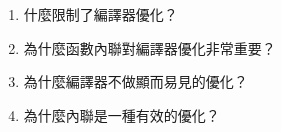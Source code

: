 \begin{enumerate}
\item 
什麼限制了編譯器優化？

\item 
為什麼函數內聯對編譯器優化非常重要？

\item 
為什麼編譯器不做顯而易見的優化？

\item
為什麼內聯是一種有效的優化？
	
\end{enumerate}